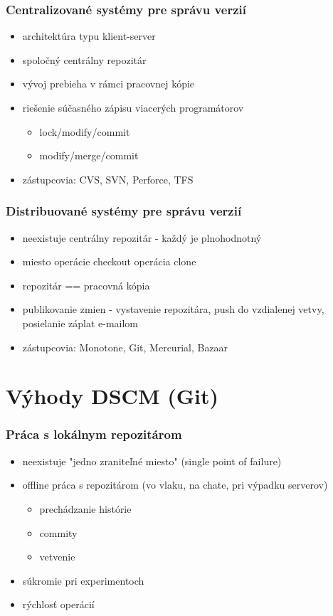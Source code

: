 \documentclass[red]{beamer}
\begin{document}
\begin{frame}
  \frametitle{Centralizované systémy pre správu verzií}   

\begin{itemize}
\item architektúra typu klient-server
\item spoločný centrálny repozitár
\item vývoj prebieha v rámci pracovnej kópie
\item riešenie súčasného zápisu viacerých programátorov
\begin{itemize}
\item lock/modify/commit
\item modify/merge/commit
 \end{itemize}
\item zástupcovia: CVS, SVN, Perforce, TFS
 \end{itemize}
\end{frame}

\begin{frame}
  \frametitle{Distribuované systémy pre správu verzií}   

\begin{itemize}
\item neexistuje centrálny repozitár - každý je plnohodnotný
\item miesto operácie checkout operácia clone
\item repozitár == pracovná kópia
\item publikovanie zmien - vystavenie repozitára, push do vzdialenej vetvy, posielanie záplat e-mailom
\item zástupcovia: Monotone, Git, Mercurial, Bazaar
 \end{itemize}
\end{frame}

\section{Výhody DSCM (Git)} %

\begin{frame}
  \frametitle{Práca s lokálnym repozitárom}   

\begin{itemize}
\item neexistuje "jedno zraniteľné miesto" (single point of failure)
\item offline práca s repozitárom (vo vlaku, na chate, pri výpadku serverov)
\begin{itemize}
\item prechádzanie histórie
\item commity
\item vetvenie
 \end{itemize}
\item súkromie pri experimentoch
\item rýchlosť operácií
 \end{itemize}
\end{frame}
\end{document}
